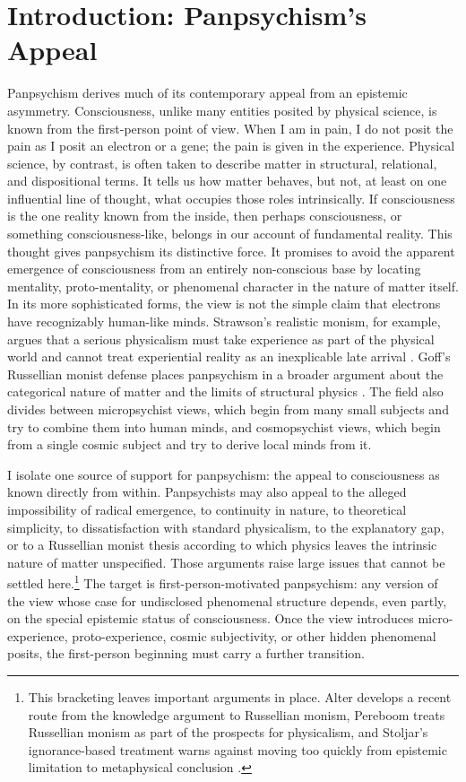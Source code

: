 \section{Introduction: Panpsychism's Appeal}

Panpsychism derives much of its contemporary appeal from an epistemic asymmetry. Consciousness, unlike many entities posited by physical science, is known from the first-person point of view. When I am in pain, I do not posit the pain as I posit an electron or a gene; the pain is given in the experience. Physical science, by contrast, is often taken to describe matter in structural, relational, and dispositional terms. It tells us how matter behaves, but not, at least on one influential line of thought, what occupies those roles intrinsically. If consciousness is the one reality known from the inside, then perhaps consciousness, or something consciousness-like, belongs in our account of fundamental reality. This thought gives panpsychism its distinctive force. It promises to avoid the apparent emergence of consciousness from an entirely non-conscious base by locating mentality, proto-mentality, or phenomenal character in the nature of matter itself. In its more sophisticated forms, the view is not the simple claim that electrons have recognizably human-like minds. Strawson's realistic monism, for example, argues that a serious physicalism must take experience as part of the physical world and cannot treat experiential reality as an inexplicable late arrival \citep{strawson2006}. Goff's Russellian monist defense places panpsychism in a broader argument about the categorical nature of matter and the limits of structural physics \citep{goff2017cfr}. The field also divides between micropsychist views, which begin from many small subjects and try to combine them into human minds, and cosmopsychist views, which begin from a single cosmic subject and try to derive local minds from it.

I isolate one source of support for panpsychism: the appeal to consciousness as known directly from within. Panpsychists may also appeal to the alleged impossibility of radical emergence, to continuity in nature, to theoretical simplicity, to dissatisfaction with standard physicalism, to the explanatory gap, or to a Russellian monist thesis according to which physics leaves the intrinsic nature of matter unspecified. Those arguments raise large issues that cannot be settled here.\footnote{This bracketing leaves important arguments in place. Alter develops a recent route from the knowledge argument to Russellian monism, Pereboom treats Russellian monism as part of the prospects for physicalism, and Stoljar's ignorance-based treatment warns against moving too quickly from epistemic limitation to metaphysical conclusion \citep{alter2023matter,pereboom2011physicalism,stoljar2006ignorance}.} The target is first-person-motivated panpsychism: any version of the view whose case for undisclosed phenomenal structure depends, even partly, on the special epistemic status of consciousness. Once the view introduces micro-experience, proto-experience, cosmic subjectivity, or other hidden phenomenal posits, the first-person beginning must carry a further transition.

